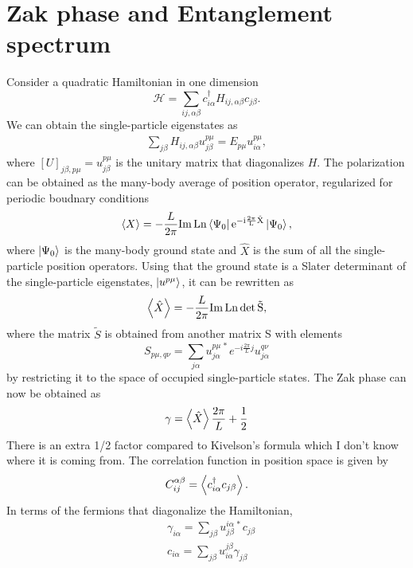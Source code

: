 \documentclass[twocolumn,amsmath,longbibliography,amssymb,superscriptaddress]{revtex4-1}
\newcommand{\carlos}[1]{{\color{red} #1}}
\begin{document}
\section{Zak phase and Entanglement spectrum}
Consider a quadratic Hamiltonian in one dimension
\begin{equation}
\mathcal{H} = \sum_{ij,\alpha\beta} c_{i\alpha}^\dagger H_{ij,\alpha \beta}c_{j\beta}.
\end{equation}
We can obtain the single-particle eigenstates as
\begin{align*}
\sum_{j\beta}H_{ij,\alpha\beta} u^{p\mu}_{j\beta} = E_{p\mu} u_{i\alpha}^{p\mu},
\end{align*}
where $[U]_{j\beta,p\mu} = u^{p\mu}_{j\beta}$ is the unitary matrix that diagonalizes $H$. The polarization can be obtained as the many-body average of position operator, regularized for periodic boudnary conditions \cite{Resta1997}
\begin{align*}
\expval{X} = -\frac{L}{2\pi} \rm{ Im\, Ln }\bra{\Psi_0}e^{-i \frac{2\pi}{L}\hat{X}}\ket{\Psi_0},
\end{align*}
where $\ket{\Psi_0}$ is the many-body ground state and $\hat{X}$ is the sum of all the single-particle position operators.
Using that the ground state is a Slater determinant of the single-particle eigenstates, $\ket{u^{p\mu}}$, it can be rewritten as
\begin{align*}
\expval{\hat{X}} = -\frac{L}{2\pi} \rm{Im \, Ln}\, {\rm det} \, \tilde{S},
\end{align*}
where the matrix $\tilde{S}$ is obtained from another matrix S with elements
\begin{equation}
S_{p\mu,q\nu} = \sum_{j\alpha}u^{p\mu\, \ast}_{j \alpha} e^{-i\frac{2\pi}{L}j}u^{q\nu}_{j \alpha}
\end{equation}
by restricting it to the space of occupied single-particle states. The Zak phase can now be obtained as
\begin{equation}
\gamma = \expval{\hat{X}}\frac{2\pi}{L} + \frac{1}{2}
\end{equation}
\carlos{There is an extra 1/2 factor compared to Kivelson's formula which I don't know where it is coming from.}
The correlation function in position space is given by
\begin{align*}
C_{ij}^{\alpha \beta} = \expval{c_{i\alpha}^\dagger c_{j\beta}}.
\end{align*}
In terms of the fermions that diagonalize the Hamiltonian, 
\begin{align*}
& \gamma_{i\alpha} = \sum_{j\beta}u_{j\beta}^{i\alpha \, \ast} c_{j\beta} \\
& c_{i\alpha} = \sum_{j\beta} u^{j\beta}_{i\alpha} \gamma_{j\beta}
\end{align*}
\end{document}
